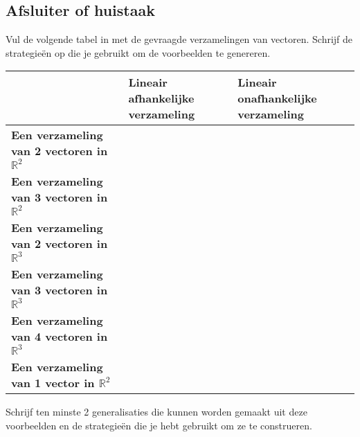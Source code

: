 \documentclass{ximera}
\begin{document}
\subsection*{Afsluiter of huistaak}
Vul de volgende tabel in met de gevraagde verzamelingen van vectoren.
Schrijf de strategieën op die je gebruikt om de voorbeelden te genereren.
\begin{table}[H]
\begin{tabular}{|p{4cm}|p{4cm}|p{4cm}|}
\hline
& \textbf{Lineair afhankelijke verzameling} & \textbf{Lineair onafhankelijke verzameling} \\
\hline
\textbf{Een verzameling van 2 vectoren in $\mathbb{R}^2$} & & \\
\hline
\textbf{Een verzameling van 3 vectoren in $\mathbb{R}^2$} & & \\
\hline
\textbf{Een verzameling van 2 vectoren in $\mathbb{R}^3$} & & \\
\hline
\textbf{Een verzameling van 3 vectoren in $\mathbb{R}^3$} & & \\
\hline
\textbf{Een verzameling van 4 vectoren in $\mathbb{R}^3$} & & \\
\hline
\textbf{Een verzameling van 1 vector in \(\mathbb{R}^2\)}  &  & \\
\hline
\end{tabular}
\end{table}
Schrijf ten minste 2 generalisaties die kunnen worden gemaakt uit deze voorbeelden en de strategieën die je hebt gebruikt om ze te construeren.
\end{document}
